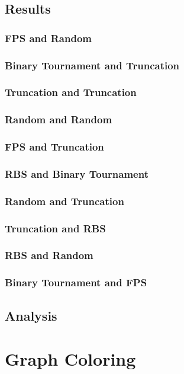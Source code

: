 \documentclass[11pt, letterpaper]{article}
\begin{document}
\subsection{Results} 
\subsubsection {FPS and Random}
\subsubsection {Binary Tournament and Truncation}
\subsubsection {Truncation and Truncation}
\subsubsection {Random and Random}
\subsubsection {FPS and Truncation}
\subsubsection {RBS and Binary Tournament}
\subsubsection {Random and Truncation}
\subsubsection {Truncation and RBS}
\subsubsection {RBS and Random}
\subsubsection {Binary Tournament and FPS}
\subsection {Analysis}

\section{Graph Coloring}
\end{document}
